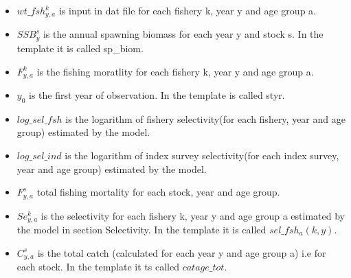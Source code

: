 \documentclass{article}
\begin{document}
\begin{itemize}
    \item $wt\_fsh^{k}_{y,a}$ is input in dat file  for each fishery k, year y and age group a.
    \item $SSB^s_{y}$ is the annual spawning biomass for each year y and stock s. In the template it is called sp\_biom.
    \item $F^{k}_{y,a}$ is the fishing moratlity for each fishery k, year y and age group a.
    \item $y_0$ is the first year of observation. In the template is called styr.
    \item $log\_sel\_fsh$ is the logarithm of fishery selectivity(for each fishery, year and age  group) estimated by the model. 
    \item $log\_sel\_ind$ is the logarithm of index survey selectivity(for each index survey, year and age  group) estimated by the model. 
    \item $F^s_{y,a}$ total fishing mortality for each stock, year and age group.
    \item $Se^k_{y,a}$ is the selectivity for each fishery k, year y and age group a estimated by the model in section Selectivity. In the template it is called $sel\_fsh_a(k,y)$.
    
    \item $C^s_{y,a}$ is the total catch (calculated for each year y  and age group a) i.e for each stock. In the template it ts called $catage\_tot$.


\end{itemize}
\end{document}
